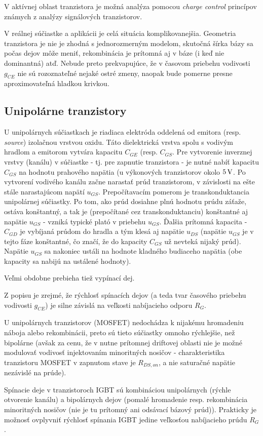 V aktívnej oblast tranzistora je možná analýza pomocou \textit{charge control} princípov známych z analýzy signálových tranzistorov.

V reálnej súčiastke a aplikácii je celá situácia komplikovanejšia. Geometria tranzistora je nie je zhodná s jednorozmerným modelom, skutočná šírka bázy sa počas dejov môže meniť, rekombinácia je prítomná aj v báze (i keď nie dominantná) atď. Nebude preto prekvapujúce, že v časovom priebehu vodivosti $g_{CE}$ nie sú rozoznateľné nejaké ostré zmeny, naopak bude pomerne presne aproximovateľná hladkou krivkou.



\subsection{Unipolárne tranzistory}
U unipolárnych súčiastkach je riadiaca elektróda oddelená od emitora (resp. \textit{source}) izolačnou vrstvou oxidu. Táto dielektrická vrstva spolu s vodivým hradlom a emitorom vytvára kapacitu $C_{GE}$ (resp. $C_{GS}$. Pre vytvorenie inverznej vrstvy (kanálu) v súčiastke - tj. pre zapnutie tranzistora - je nutné nabíť  kapacitu $C_{GS}$ na hodnotu prahového napätia (u výkonových tranzistorov okolo $5\, \mathrm{V}$. Po vytvorení vodivého kanálu začne narastať prúd tranzistorom, v závislosti na ešte stále narastajúcom napätí $u_{GS}$. Prepočítavacím pomerom je transkonduktancia unipolárnej súčiastky. Po tom, ako prúd dosiahne plnú hodnotu prúdu záťaže, ostáva konštantný, a tak je (prepočítané cez transkonduktanciu) konštantné aj napätie $u_{GS}$ - vzniká typické plató v priebehu $u_{GS}$. Ďalšia prítomná kapacita - $C_{GD}$ je vybíjaná prúdom do hradla a tým klesá aj napätie $u_{DS}$ (napätie $u_{GS}$ je v tejto fáze konštantné, čo značí, že do kapacity $C_{GS}$ už nevteká nijaký prúd). Napätie $u_{GS}$ sa nakoniec ustáli na hodnote kladného budiaceho napätia (obe kapacity sa nabijú na ustálené hodnoty).

Veľmi obdobne prebieha tiež vypínací dej.

Z popisu je zrejmé, že rýchlosť  spínacích dejov (a teda tvar časového priebehu vodivosti $g_{CE}$) je silne závislá na veľkosti nabíjacieho odporu $R_G$. 

U unipolárnych tranzistorov (MOSFET) nedochádza k nijakému hromadeniu náboja alebo rekombinácii, preto sú tieto súčiastky omnoho rýchlejšie, než bipolárne (avšak za cenu, že v nutne prítomnej driftovej oblasti nie je možné modulovať vodivosť injektovaním minoritných nosičov - charakteristika tranzistoru MOSFET v zapnutom stave je $R_{DS,on}$, a nie saturačné napätie nezávislé na prúde).

Spínacie deje v tranzistoroch IGBT sú kombináciou unipolárnych (rýchle otvorenie kanálu) a bipolárnych dejov (pomalé hromadenie resp. rekombinácia minoritných nosičov (nie je tu prítomný ani odsávací bázový prúd)). Prakticky je možnosť ovplyvniť rýchlosť spínania IGBT jedine veľkosťou nabíjacieho prúdu $R_G$.
